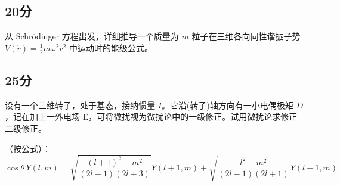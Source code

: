 \subsection{20分}
 从 Schrödinger 方程出发，详细推导一个质量为 $m$ 粒子在三维各向同性谐振子势 $V(\dot{r}) = \frac{1}{2} m \omega^2 r^2$ 中运动时的能级公式。
\subsection{25分}
 设有一个三维转子，处于基态，接纳惯量 $I$。它沿(转子)轴方向有一小电偶极矩 $D$，记在加上一外电场 E，可将微扰视为微扰论中的一级修正。试用微扰论求修正二级修正。

（按公式）：
$$\cos \theta \, Y(l, m) = \sqrt{\frac{(l+1)^2 - m^2}{(2l+1)(2l+3)}} Y(l+1, m) 
+ \sqrt{\frac{l^2 - m^2}{(2l-1)(2l+1)}} Y(l-1, m)~$$
